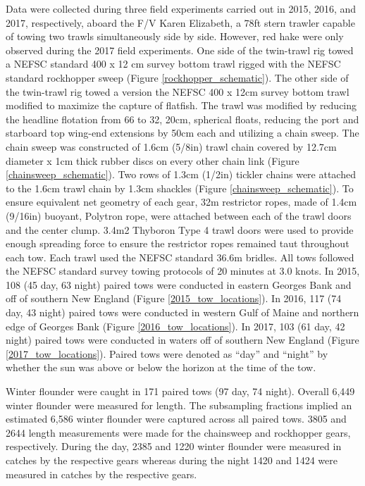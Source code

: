 \documentclass[]{article}
\begin{document}
Data were collected during three field experiments carried out in 2015,
2016, and 2017, respectively, aboard the F/V Karen Elizabeth, a 78ft
stern trawler capable of towing two trawls simultaneously side by side.
However, red hake were only observed during the 2017 field experiments.
One side of the twin-trawl rig towed a NEFSC standard 400 x 12 cm survey
bottom trawl rigged with the NEFSC standard rockhopper sweep
\citep{politisetal14} (Figure \ref{rockhopper_schematic}). The other
side of the twin-trawl rig towed a version the NEFSC 400 x 12cm survey
bottom trawl modified to maximize the capture of flatfish. The trawl was
modified by reducing the headline flotation from 66 to 32, 20cm,
spherical floats, reducing the port and starboard top wing-end
extensions by 50cm each and utilizing a chain sweep. The chain sweep was
constructed of 1.6cm (5/8in) trawl chain covered by 12.7cm diameter x
1cm thick rubber discs on every other chain link (Figure
\ref{chainsweep_schematic}). Two rows of 1.3cm (1/2in) tickler chains
were attached to the 1.6cm trawl chain by 1.3cm shackles (Figure
\ref{chainsweep_schematic}). To ensure equivalent net geometry of each
gear, 32m restrictor ropes, made of 1.4cm (9/16in) buoyant, Polytron
rope, were attached between each of the trawl doors and the center
clump. 3.4m2 Thyboron Type 4 trawl doors were used to provide enough
spreading force to ensure the restrictor ropes remained taut throughout
each tow. Each trawl used the NEFSC standard 36.6m bridles. All tows
followed the NEFSC standard survey towing protocols of 20 minutes at 3.0
knots. In 2015, 108 (45 day, 63 night) paired tows were conducted in
eastern Georges Bank and off of southern New England (Figure
\ref{2015_tow_locations}). In 2016, 117 (74 day, 43 night) paired tows
were conducted in western Gulf of Maine and northern edge of Georges
Bank (Figure \ref{2016_tow_locations}). In 2017, 103 (61 day, 42 night)
paired tows were conducted in waters off of southern New England (Figure
\ref{2017_tow_locations}). Paired tows were denoted as ``day'' and
``night'' by whether the sun was above or below the horizon at the time
of the tow.

Winter flounder were caught in 171 paired tows (97 day, 74 night).
Overall 6,449 winter flounder were measured for length. The subsampling
fractions implied an estimated 6,586 winter flounder were captured
across all paired tows. 3805 and 2644 length measurements were made for
the chainsweep and rockhopper gears, respectively. During the day, 2385
and 1220 winter flounder were measured in catches by the respective
gears whereas during the night 1420 and 1424 were measured in catches by
the respective gears.
\end{document}

